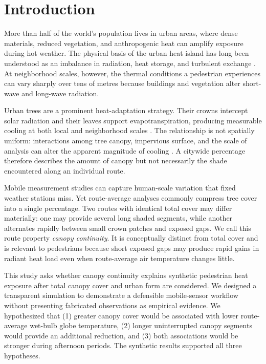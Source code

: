 \section{Introduction}
More than half of the world's population lives in urban areas, where dense materials, reduced vegetation, and anthropogenic heat can amplify exposure during hot weather. The physical basis of the urban heat island has long been understood as an imbalance in radiation, heat storage, and turbulent exchange \cite{Oke1982}. At neighborhood scales, however, the thermal conditions a pedestrian experiences can vary sharply over tens of metres because buildings and vegetation alter short-wave and long-wave radiation.

Urban trees are a prominent heat-adaptation strategy. Their crowns intercept solar radiation and their leaves support evapotranspiration, producing measurable cooling at both local and neighborhood scales \cite{Bowler2010,Armson2012}. The relationship is not spatially uniform: interactions among tree canopy, impervious surface, and the scale of analysis can alter the apparent magnitude of cooling \cite{Ziter2019}. A citywide percentage therefore describes the amount of canopy but not necessarily the shade encountered along an individual route.

Mobile measurement studies can capture human-scale variation that fixed weather stations miss. Yet route-average analyses commonly compress tree cover into a single percentage. Two routes with identical total cover may differ materially: one may provide several long shaded segments, while another alternates rapidly between small crown patches and exposed gaps. We call this route property \emph{canopy continuity}. It is conceptually distinct from total cover and is relevant to pedestrians because short exposed gaps may produce rapid gains in radiant heat load even when route-average air temperature changes little.

This study asks whether canopy continuity explains synthetic pedestrian heat exposure after total canopy cover and urban form are considered. We designed a transparent simulation to demonstrate a defensible mobile-sensor workflow without presenting fabricated observations as empirical evidence. We hypothesized that (1) greater canopy cover would be associated with lower route-average wet-bulb globe temperature, (2) longer uninterrupted canopy segments would provide an additional reduction, and (3) both associations would be stronger during afternoon periods. The synthetic results supported all three hypotheses.
